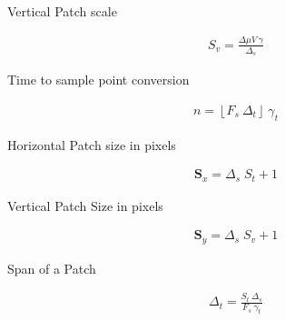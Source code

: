 \begin{subappendices}
Vertical Patch scale

\begin{align*}
S_v= \frac{\Delta \mu V \ \gamma}{\Delta_s} 
\end{align*}

Time to sample point conversion

\begin{align*}
n = \left\lfloor F_s \ \Delta_t \right\rfloor \ \gamma_t
\end{align*}

Horizontal Patch size in pixels

\begin{align*}
\mathbf{S}_x = \Delta_s \; S_t + 1
\end{align*}

Vertical Patch Size in pixels

\begin{align*}
\mathbf{S}_y = \Delta_s \; S_v + 1
\end{align*}

Span of a Patch

\begin{align*}
\Delta_t = \frac{S_t \ \Delta_s}{F_s \ \gamma_t} 
\end{align*}

\end{subappendices}